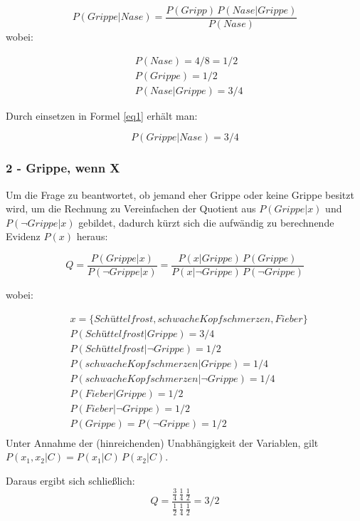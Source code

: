 \begin{equation}
P(Grippe|Nase) = \frac{P(Gripp)\, P(Nase|Grippe)}{P(Nase)}
\label{eq1}
\end{equation}
wobei:

\begin{align*}
&P(Nase) = 4/8 = 1/2 \\
&P(Grippe) = 1/2 \\
&P(Nase|Grippe) = 3/4
\end{align*}

Durch einsetzen in Formel \ref{eq1} erhält man:

\begin{equation*}
P(Grippe|Nase) = 3/4
\end{equation*}

\subsubsection*{2 - Grippe, wenn X}
Um die Frage zu beantwortet, ob jemand eher Grippe oder keine Grippe besitzt wird, um die Rechnung zu Vereinfachen der Quotient aus $P(Grippe|x)$ und $P(\neg Grippe|x)$ gebildet, dadurch kürzt sich die aufwändig zu berechnende Evidenz $P(x)$ heraus:

\begin{equation}
Q = \frac{P(Grippe|x)}{P(\neg Grippe|x)} = \frac{P(x|Grippe) \, P(Grippe)}{P(x|\neg Grippe) \, P(\neg Grippe)}
\end{equation}

wobei:

\begin{align*}
& x = \{Schüttelfrost, schwache Kopfschmerzen, Fieber\} \\
& P(Schüttelfrost|Grippe) = 3/4 \\
& P(Schüttelfrost|\neg Grippe) = 1/2 \\
& P(schwache Kopfschmerzen|Grippe) = 1/4 \\
& P(schwache Kopfschmerzen|\neg Grippe) = 1/4 \\
& P(Fieber|Grippe) = 1/2 \\
& P(Fieber|\neg Grippe) = 1/2 \\
& P(Grippe) = P(\neg Grippe) = 1/2 \\
\end{align*}
Unter Annahme der (hinreichenden) Unabhängigkeit der Variablen, gilt $P(x_1, x_2 |C) = P(x_1|C)\, P(x_2|C)$.

Daraus ergibt sich schließlich:
\begin{equation*}
Q = \frac{\frac{3}{4} \, \frac{1}{4}\, \frac{1}{2}}{\frac{1}{2} \, \frac{1}{4}\, \frac{1}{2}} = 3/2
\end{equation*}

